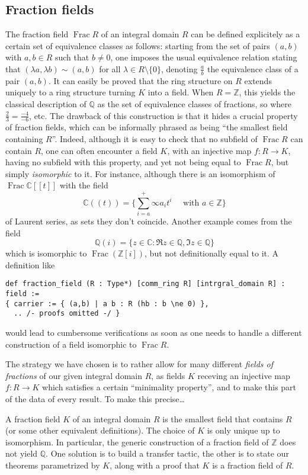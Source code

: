 \documentclass[a4paper,USenglish,cleveref, autoref, thm-restate]{lipics-v2021}
\newcommand{\C}{\mathbb{C}}
\newcommand{\Q}{\mathbb{Q}}
\newcommand{\Z}{\mathbb{Z}}
\DeclareMathOperator{\Frac}{Frac}
\begin{document}
\subsection{Fraction fields}
The fraction field $\Frac R$ of an integral domain $R$ can be defined explicitely as a certain set of equivalence classes as follows: starting from the set of pairs $(a,b)$ with $a,b \in R$ such that $b\neq 0$, one imposes the usual equivalence relation stating that $(\lambda a,\lambda b)\sim (a,b)$ for all $\lambda \in R\setminus\{0\}$, denoting $\frac{a}{b}$ the equivalence class of a pair $(a,b)$. It can easily be proved that the ring structure on $R$ extends uniquely to a ring structure turning $K$ into a field. When $R=\Z$, this yields the classical description of $\Q$ as the set of equivalence classes of fractions, so where $\frac{2}{3}=\frac{-4}{-6}$, etc. The drawback of this construction is that it hides a crucial property of fraction fields, which can be informally phrased as being ``the smallest field containing $R$''. Indeed, although it is easy to check that no subfield of $\Frac R$ can contain $R$, one can often encounter a field $K$, with an injective map $f\colon R\to K$, having no subfield with this property, and yet not being equal to $\Frac R$, but simply \emph{isomorphic} to it. For instance, although there is an isomorphism of $\Frac \C[\![t]\!]$ with the field 
\[
\C(\!(t)\!)=\big\{\sum_{i=a}^+\infty a_it^i\quad\text{ with }a \in \Z\big\}
\]
of Laurent series, as sets they don't coincide. Another example comes from the field
\[
\Q(i)=\{z \in \C : \Re z \in \Q, \Im z\in\Q\}
\]
which is isomorphic to $\Frac (\Z[i])$, but not definitionally equal to it. A definition like
\begin{lstlisting}
def fraction_field (R : Type*) [comm_ring R] [intrgral_domain R] : field :=
{ carrier := { (a,b) | a b : R (hb : b \ne 0) },
  .. /- proofs omitted -/ }
\end{lstlisting}
would lead to cumbersome verifications as soon as one needs to handle a different construction of a field isomorphic to $\Frac R$.

The strategy we have chosen is to rather allow for many different \emph{fields of fractions} of our given integral domain $R$, as fields $K$ receving an injective map $f\colon R\to K$ which satisfies a certain ``minimality property'', and to make this part of the data of every result. To make this precise\dots

\bigskip


A fraction field $K$ of an integral domain $R$ is the smallest field that contains $R$ (or some other equivalent definitions).
The choice of $K$ is only unique up to isomorphism.
In particular, the generic construction of a fraction field of $\Z$ does not yield $\Q$.
One solution is to build a transfer tactic, the other is to state our theorems parametrized by $K$, along with a proof that $K$ is a fraction field of $R$.
\end{document}
